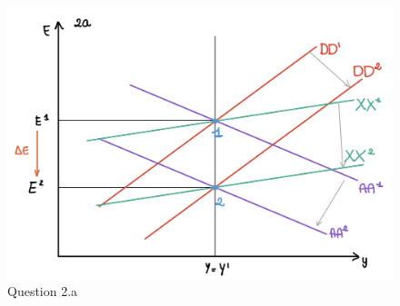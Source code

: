 \documentclass[	11pt, ]{fphw}
\begin{document}
\begin{figure}[h!] 
\centering 
\includegraphics[scale=0.27]{8a.PNG} 
\caption{Question 2.a} 
\label{aa}
\end{figure}
\end{document}
